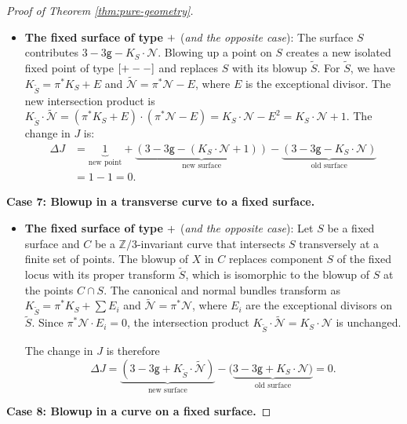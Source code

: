 \documentclass[10pt,a4paper]{amsart}
\newcommand{\Z}{\mathbb{Z}}
\newcommand{\lm}{\textup{\texttt{-}}}
\newcommand{\lp}{\textup{\texttt{+}}}
\begin{document}
\begin{proof}[Proof of Theorem \ref{thm:pure-geometry}]
\begin{itemize}
    \item \textbf{The fixed surface of type $\lp$} (\textit{and the opposite case}):  The surface $S$ contributes $3 - 3\mathsf{g} - K_S \cdot \mathcal{N}$. Blowing up a point on $S$ creates a new isolated fixed point of type $[\lp\lm\lm]$ and replaces $S$ with its blowup $\widetilde{S}$. For $\widetilde{S}$, we have $K_{\widetilde{S}} = \pi^{\ast}K_S + E$ and $\widetilde{\mathcal{N}} = \pi^{\ast}\mathcal{N} - E$, where $E$ is the exceptional divisor. The new intersection product is $K_{\widetilde{S}} \cdot \widetilde{\mathcal{N}} = (\pi^{\ast}K_S + E) \cdot (\pi^{\ast}\mathcal{N} - E) = K_S \cdot \mathcal{N} - E^2 = K_S \cdot \mathcal{N} + 1$. The change in $J$ is:
    \begin{align}
        \Delta J &= \underbrace{1}_{\text{new point}} + \underbrace{(3 - 3\mathsf{g} - (K_S\cdot\mathcal{N} + 1))}_{\text{new surface}} - \underbrace{(3 - 3\mathsf{g} - K_S\cdot\mathcal{N})}_{\text{old surface}} \\
        &= 1 - 1 = 0.
    \end{align}
\end{itemize}

\noindent \textbf{Case 7: Blowup in a transverse curve to a fixed surface.}
\begin{itemize}
    \item  \textbf{The fixed surface of type $\lp$} (\textit{and the opposite case}): Let $S$ be a fixed surface and $C$ be a $\Z/3$-invariant curve that intersects $S$ transversely at a finite set of points.  The blowup of $X$ in $C$ replaces component $S$ of the fixed locus with its proper transform $\widetilde{S}$, which is isomorphic to the blowup of $S$ at the points $C \cap S$. The canonical and normal bundles transform as $K_{\widetilde{S}} = \pi^{\ast}K_S + \sum E_i$ and $\widetilde{\mathcal{N}} = \pi^{\ast}\mathcal{N}$, where $E_i$ are the exceptional divisors on $\widetilde{S}$. Since $\pi^{\ast}\mathcal{N} \cdot E_i = 0$, the intersection product $K_{\widetilde{S}}\cdot\widetilde{\mathcal{N}} = K_S\cdot\mathcal{N}$ is unchanged. 
    
    The change in $J$ is therefore $$\Delta J = \underbrace{(3-3\mathsf g +K_{\widetilde S}\cdot \widetilde{\mathcal N} )}_{\text{new surface}} -   (\underbrace{3-3\mathsf g +K_{S}\cdot \mathcal N)}_{\text{old surface}}= 0.$$
\end{itemize}

\noindent \textbf{Case 8: Blowup in a curve on a fixed surface.}


\end{proof}
\end{document}

